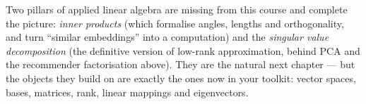 \begin{remark}
Two pillars of applied linear algebra are missing from this course and complete the picture: \emph{inner
products} (which formalise angles, lengths and orthogonality, and turn ``similar embeddings'' into a
computation) and the \emph{singular value decomposition} (the definitive version of low-rank
approximation, behind PCA and the recommender factorisation above). They are the natural next chapter —
but the objects they build on are exactly the ones now in your toolkit: vector spaces, bases, matrices,
rank, linear mappings and eigenvectors.
\end{remark}
